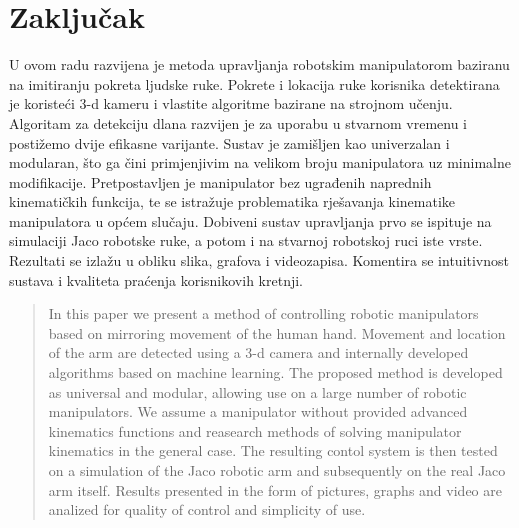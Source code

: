 \documentclass[times, utf8, diplomski, numeric]{fer}
\begin{document}
\chapter{Zaključak}


\begin{sazetak}
U ovom radu razvijena je metoda upravljanja robotskim manipulatorom baziranu na imitiranju pokreta ljudske ruke. Pokrete i lokacija ruke korisnika detektirana je koristeći 3-d kameru i vlastite algoritme bazirane na strojnom učenju. Algoritam za detekciju dlana razvijen je za uporabu u stvarnom vremenu i postižemo dvije efikasne varijante. Sustav je zamišljen kao univerzalan i modularan, što ga čini primjenjivim na velikom broju manipulatora uz minimalne modifikacije. Pretpostavljen je manipulator bez ugrađenih naprednih kinematičkih funkcija, te se istražuje problematika rješavanja kinematike manipulatora u općem slučaju. Dobiveni sustav upravljanja prvo se ispituje na simulaciji Jaco robotske ruke, a potom i na stvarnoj robotskoj ruci iste vrste. Rezultati se izlažu u obliku slika, grafova i videozapisa. Komentira se intuitivnost sustava i kvaliteta praćenja korisnikovih kretnji.
\end{sazetak}

\begin{abstract}
In this paper we present a method of controlling robotic manipulators based on mirroring movement of the human hand. Movement and location of the arm are detected using a 3-d camera and internally developed algorithms based on machine learning. The proposed method is developed as universal and modular, allowing use on a large number of robotic manipulators. We assume a manipulator without provided advanced kinematics functions and reasearch methods of solving manipulator kinematics in the general case. The resulting contol system is then tested on a simulation of the Jaco robotic arm and subsequently on the real Jaco arm itself. Results presented in the form of pictures, graphs and video are analized for quality of control and simplicity of use.
\end{abstract}
\end{document}
